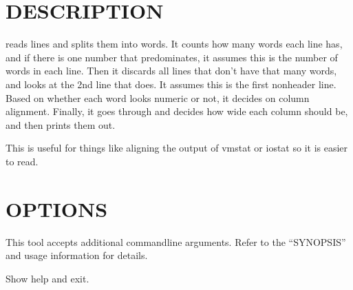 \documentclass[letterpaper,10pt,english]{sphinxmanual}
\begin{document}
\section{DESCRIPTION}
\label{\detokenize{mariadb-align-output:description}}
 reads lines and splits them into words.  It counts how many
words each line has, and if there is one number that predominates, it assumes
this is the number of words in each line.  Then it discards all lines that
don’t have that many words, and looks at the 2nd line that does.  It assumes
this is the first non\sphinxhyphen{}header line.  Based on whether each word looks numeric
or not, it decides on column alignment.  Finally, it goes through and decides
how wide each column should be, and then prints them out.

This is useful for things like aligning the output of vmstat or iostat so it
is easier to read.


\section{OPTIONS}
\label{\detokenize{mariadb-align-output:options}}
This tool accepts additional command\sphinxhyphen{}line arguments.  Refer to the
“SYNOPSIS” and usage information for details.

\begin{fulllineitems}
\label{\detokenize{mariadb-align-output:cmdoption-mariadb-align-output-help}}
Show help and exit.

\end{fulllineitems}

\end{document}
